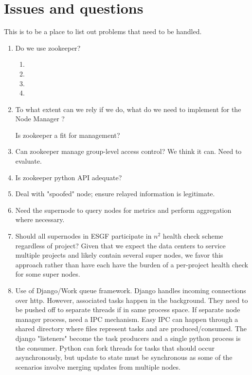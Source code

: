 \documentclass[oneside,12pt]{memoir}
\def\nm{Node Manager{ }}
\begin{document}
\section{Issues and questions}
This is to be a place to list out problems that need to be handled.
\begin{enumerate}
\item
Do we use zookeeper?
\begin{enumerate}
\item {}
\item {}
\item {}
\item {} 
\end{enumerate}
\item
To what extent can we rely if we do,  what do we need to implement for the \nm?

Is zookeeper a fit for management?
\item
Can zookeeper manage group-level access control?  We think it can.  Need to evaluate.
\item
Is zookeeper python API adequate?

\item
Deal with "spoofed" node; ensure relayed information is legitimate. 
\item
Need the supernode to query nodes for metrics and perform aggregation where necessary.
\item
Should all supernodes in ESGF participate in $n^2$ health check scheme regardless of project? Given that we expect the data centers to service multiple projects and likely contain several super nodes, we favor this approach rather than have each have the burden of a per-project health check for some super nodes.
\item  Use of Django/Work queue framework.  Django handles incoming connections over http.  However, associated tasks happen in the background.  They need to be pushed off to separate threads if in same process space.  If separate node manager process, need a IPC mechanism.  Easy IPC can happen through a shared directory where files represent tasks and are produced/consumed.  The django "listeners" become the task producers and a single python process is the consumer.   Python can fork threads for tasks that should occur asynchronously, but update to state must be synchronous as some of the scenarios involve merging updates from multiple nodes.



\end{enumerate}
\end{document}
